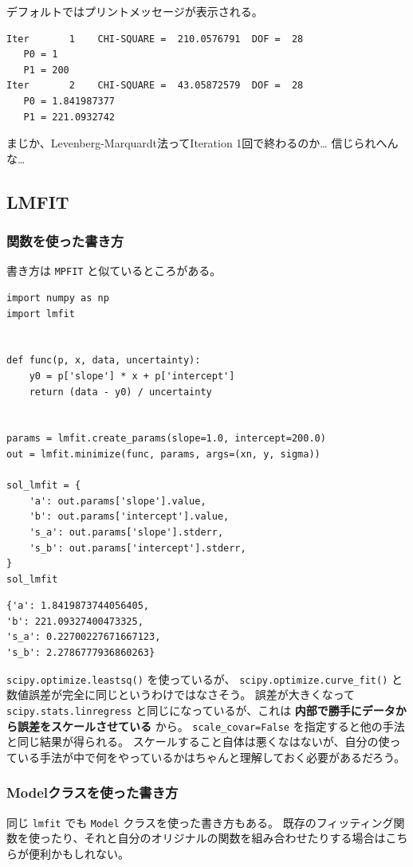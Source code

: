 \documentclass[a4paper, 8pt, notitlepage, uplatex, dvipdfmx]{jsarticle}
\begin{document}
デフォルトではプリントメッセージが表示される。
\begin{verbatim}
Iter       1    CHI-SQUARE =  210.0576791  DOF =  28
   P0 = 1  
   P1 = 200  
Iter       2    CHI-SQUARE =  43.05872579  DOF =  28
   P0 = 1.841987377  
   P1 = 221.0932742  
\end{verbatim}
まじか、Levenberg-Marquardt法ってIteration 1回で終わるのか\ldots{} 信じられへんな\ldots{}
\subsection{LMFIT}
\label{sec:org3ffdc2e}
\subsubsection{関数を使った書き方}
\label{sec:orga8a085f}
書き方は \texttt{MPFIT} と似ているところがある。

\begin{verbatim}
import numpy as np
import lmfit


def func(p, x, data, uncertainty):
    y0 = p['slope'] * x + p['intercept']
    return (data - y0) / uncertainty


params = lmfit.create_params(slope=1.0, intercept=200.0)
out = lmfit.minimize(func, params, args=(xn, y, sigma))

sol_lmfit = {
    'a': out.params['slope'].value,
    'b': out.params['intercept'].value,
    's_a': out.params['slope'].stderr,
    's_b': out.params['intercept'].stderr,
}
sol_lmfit
\end{verbatim}

\label{}
\begin{verbatim}
{'a': 1.8419873744056405,
'b': 221.09327400473325,
's_a': 0.22700227671667123,
's_b': 2.2786777936860263}
\end{verbatim}

\texttt{scipy.optimize.leastsq()} を使っているが、 \texttt{scipy.optimize.curve\_fit()} と数値誤差が完全に同じというわけではなさそう。
誤差が大きくなって \texttt{scipy.stats.linregress} と同じになっているが、これは \textbf{内部で勝手にデータから誤差をスケールさせている} から。
\texttt{scale\_covar=False} を指定すると他の手法と同じ結果が得られる。
スケールすること自体は悪くなはないが、自分の使っている手法が中で何をやっているかはちゃんと理解しておく必要があるだろう。
\subsubsection{Modelクラスを使った書き方}
\label{sec:org12eeaa9}
同じ \texttt{lmfit} でも \texttt{Model} クラスを使った書き方もある。
既存のフィッティング関数を使ったり、それと自分のオリジナルの関数を組み合わせたりする場合はこちらが便利かもしれない。
\end{document}
